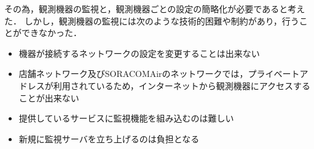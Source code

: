 その為，観測機器の監視と，観測機器ごとの設定の簡略化が必要であると考えた．
しかし，観測機器の監視には次のような技術的困難や制約があり，行うことができなかった．
\begin{itemize}
\item 機器が接続するネットワークの設定を変更することは出来ない
\item 店舗ネットワーク及びSORACOMAirのネットワークでは，プライベートアドレスが利用されているため，インターネットから観測機器にアクセスすることが出来ない
\item 提供しているサービスに監視機能を組み込むのは難しい
\item 新規に監視サーバを立ち上げるのは負担となる
\end{itemize}

